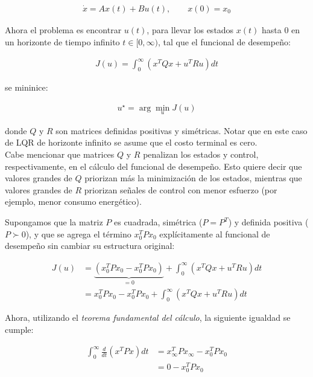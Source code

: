 \begin{align*}
    \dot{x} = A x(t) + B u(t), \qquad x(0) = x_0
\end{align*}

Ahora el problema es encontrar $u(t)$, para llevar los estados $x(t)$ hasta $0$ en un horizonte de tiempo infinito $t \in [0,\infty)$, tal que el funcional de desempeño:

\begin{align*}
    J(u)=\int_{0}^{\infty} \left(x^T Q x+u^T R u \right) dt
\end{align*}

se mininice:

\begin{align*}
    u^\star = \arg \min_u J(u)
\end{align*}

donde $Q$ y $R$ son matrices definidas positivas y simétricas. Notar que en este caso de LQR de horizonte infinito se asume que el costo terminal es cero.\\

Cabe mencionar que matrices $Q$ y $R$ penalizan los estados y control, respectivamente, en el cálculo del funcional de desempeño. Esto quiere decir que valores grandes de $Q$ priorizan más la minimización de los estados, mientras que valores grandes de $R$ priorizan señales de control con menor esfuerzo (por ejemplo, menor consumo energético).

Supongamos que la matriz $P$ es cuadrada, simétrica ($P = P^T$) y definida positiva ($P \succ 0$), y que se agrega el término $x_0^T P x_0$ explícitamente al funcional de desempeño sin cambiar su estructura original:

\begin{align*}
    J(u) &= \underbrace{\left( x_0^T P x_0 - x_0^T P x_0 \right)}_{=0} + \int_{0}^{\infty} \left(x^T Q x+u^T R u \right) dt \\
    & = x_0^T P x_0 - x_0^T P x_0 + \int_{0}^{\infty} \left(x^T Q x+u^T R u \right) dt
\end{align*}

Ahora, utilizando el \emph{teorema fundamental del cálculo}, la siguiente igualdad se cumple:

\begin{subequations}
\begin{align}
    \int_{0}^{\infty} \frac{d}{dt}\left( x^T P x\right) dt &= x_\infty^T P x_\infty - x_0^T P x_0 \\
                              &= 0 - x_0^T P x_0
\end{align} 
\end{subequations}

